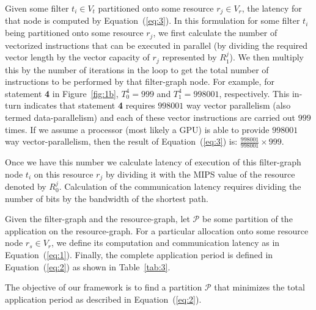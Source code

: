\documentclass[10pt, conference, compsocconf, reqno]{IEEEtran}
\begin{document}
Given some filter $t_i \in V_t$ partitioned onto some resource $r_j \in V_r$,
the latency for that node is computed by Equation~(\ref{eq:3}). In this
formulation for some filter $t_i$ being partitioned onto some resource $r_j$,
we first calculate the number of vectorized instructions that can be
executed in parallel (by dividing the required vector length by the
vector capacity of $r_j$ represented by $R^j_1$). We then multiply this
by the number of iterations in the loop to get the total number of
instructions to be performed by that filter-graph node. For example, for
statement \textbf{4} in Figure~\ref{fig:1b}, $T^4_0=999$ and
$T^4_1=998001$, respectively. This in-turn indicates that statement
\textbf{4} requires $998001$ way vector parallelism (also termed
data-parallelism) and each of these vector instructions are carried out
$999$ times. If we assume a processor (most likely a GPU) is able to
provide $998001$ way vector-parallelism, then the result of
Equation~(\ref{eq:3}) is: $\frac{998001}{998001}\times999$.

Once we have this number we calculate latency of execution of this
filter-graph node $t_i$ on this resource $r_j$ by dividing it with the
MIPS value of the resource denoted by $R^j_0$. Calculation of the
communication latency requires dividing the number of bits by the
bandwidth of the shortest path.

Given the filter-graph and the resource-graph, let $\mathcal{P}$ be some
partition of the application on the resource-graph. For a particular
allocation onto some resource node $r_s \in V_r$, we define its
computation and communication latency as in Equation~(\ref{eq:1}).
Finally, the complete application period is defined in Equation~(\ref{eq:2})
as shown in Table~\ref{tab:3}.

The objective of our framework is to find a partition $\mathcal{P}$
that minimizes the total application period as described in
Equation~(\ref{eq:2}).
\end{document}
